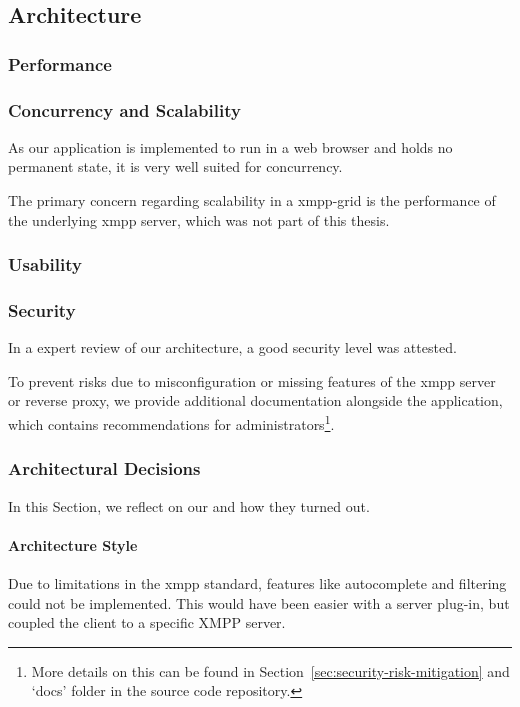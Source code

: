 \subsection{Architecture}

\subsubsection{Performance}

\subsubsection{Concurrency and Scalability}
As our application is implemented to run in a web browser and holds no permanent state, it is very well suited for concurrency.

The primary concern regarding scalability in a \gls{xmpp-grid} is the performance of the underlying \gls{xmpp} server, which was not part of this thesis.


\subsubsection{Usability}

\subsubsection{Security}
In a expert review of our architecture, a good security level was attested.

To prevent risks due to misconfiguration or missing features of the \gls{xmpp} server or reverse proxy, we provide additional documentation alongside the application, which contains recommendations for administrators\footnote{More details on this can be found in Section~\ref{sec:security-risk-mitigation} and `docs' folder in the source code repository.}.

\subsubsection{Architectural Decisions}
In this Section, we reflect on our  and how they turned out.

\paragraph{Architecture Style}
Due to limitations in the \gls{xmpp} standard, features like autocomplete and filtering could not be implemented.
This would have been easier with a server plug-in, but coupled the client to a specific XMPP server.

